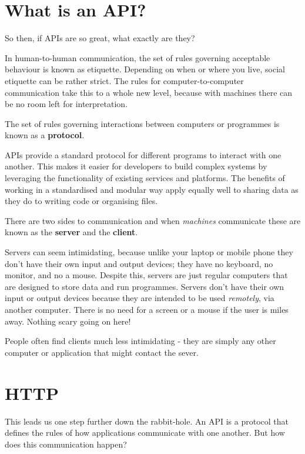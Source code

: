 \documentclass[
  letterpaper,
  DIV=11,
  numbers=noendperiod]{scrreprt}
\begin{document}
\section{What is an API?}\label{what-is-an-api}

So then, if APIs are so great, what exactly are they?

In human-to-human communication, the set of rules governing acceptable
behaviour is known as etiquette. Depending on when or where you live,
social etiquette can be rather strict. The rules for
computer-to-computer communication take this to a whole new level,
because with machines there can be no room left for interpretation.

The set of rules governing interactions between computers or programmes
is known as a \textbf{protocol}.

APIs provide a standard protocol for different programs to interact with
one another. This makes it easier for developers to build complex
systems by leveraging the functionality of existing services and
platforms. The benefits of working in a standardised and modular way
apply equally well to sharing data as they do to writing code or
organising files.

There are two sides to communication and when \emph{machines}
communicate these are known as the \textbf{server} and the
\textbf{client}.

Servers can seem intimidating, because unlike your laptop or mobile
phone they don't have their own input and output devices; they have no
keyboard, no monitor, and no a mouse. Despite this, servers are just
regular computers that are designed to store data and run programmes.
Servers don't have their own input or output devices because they are
intended to be used \emph{remotely}, via another computer. There is no
need for a screen or a mouse if the user is miles away. Nothing scary
going on here!

People often find clients much less intimidating - they are simply any
other computer or application that might contact the sever.

\section{HTTP}\label{http}

This leads us one step further down the rabbit-hole. An API is a
protocol that defines the rules of how applications communicate with one
another. But how does this communication happen?
\end{document}
